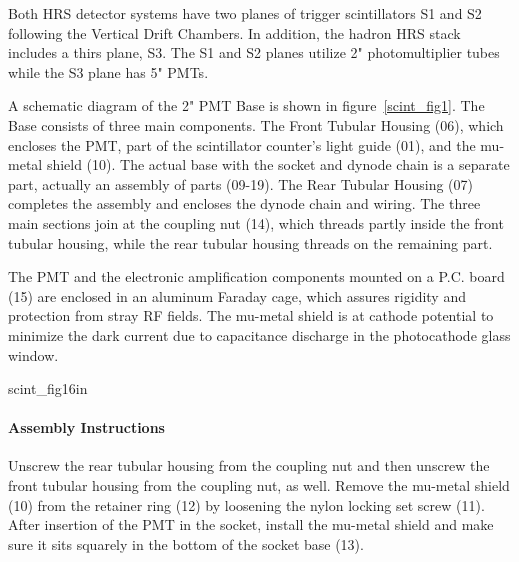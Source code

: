 

Both HRS detector systems have two planes of trigger scintillators S1 and S2
following the Vertical Drift Chambers. In addition, the hadron HRS stack includes
a thirs plane, S3. The S1 and S2 planes utilize 2" photomultiplier tubes while the 
S3 plane has 5" PMTs.

   A schematic diagram of the 2" PMT Base is shown in figure~\ref{scint_fig1}. 
 The Base consists of three main components. 
The 
Front Tubular Housing (06), which encloses the PMT, part of the scintillator 
counter's light guide (01), and the mu-metal shield (10). The actual base with 
the socket and dynode chain is a separate part, actually an assembly of parts 
(09-19). The Rear Tubular Housing (07) completes the assembly and encloses the 
dynode chain and wiring. The three main sections join at the coupling nut (14), 
which threads partly inside the front tubular housing, while the rear tubular 
housing threads on the remaining part.

The PMT and the electronic amplification components mounted on a P.C. board 
(15) are enclosed in an aluminum Faraday cage, which assures rigidity and 
protection from stray RF fields. The mu-metal shield is at cathode potential to 
minimize the dark current due to capacitance discharge in the photocathode 
glass window.

{scint_fig1}{6in}

\paragraph{Assembly Instructions}

   Unscrew the rear tubular housing from the coupling nut and then unscrew the
front tubular housing from the coupling nut, as well.  Remove the mu-metal
shield (10) from the retainer ring (12) by loosening the nylon locking set screw
(11). After insertion of the PMT in the socket, install the mu-metal shield and
make sure it sits squarely in the bottom of the socket base (13). 

